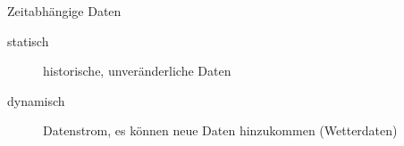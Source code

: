 \begin{TOP}{Zeitabhängige Daten}
\vspace*{-1.5\baselineskip}
\begin{description}
	\item[statisch] historische, unveränderliche Daten
	\item[dynamisch] Datenstrom, es können neue Daten hinzukommen (Wetterdaten)
\end{description}
\end{TOP}
